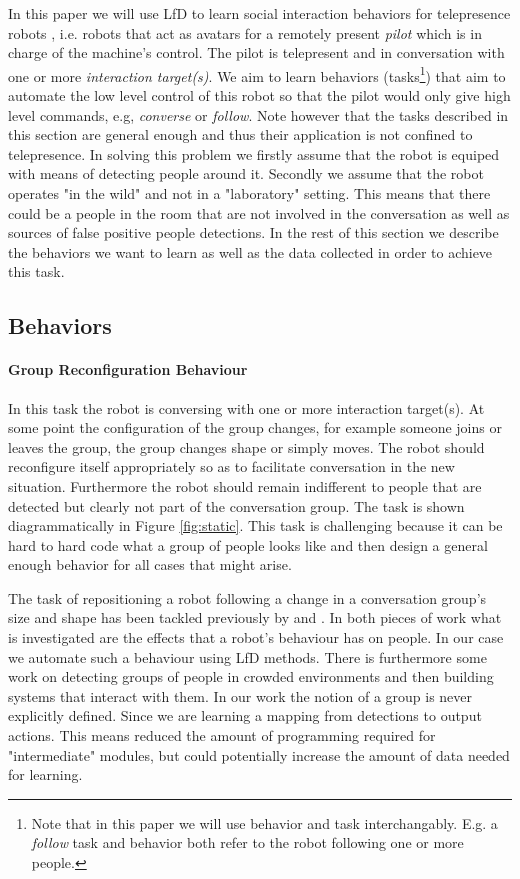 \documentclass[letterpaper, 10 pt, conference]{ieeeconf}
\begin{document}
In this paper we will use LfD to learn social interaction behaviors for telepresence robots \cite{kristoffersson2013review}, i.e. robots that act as avatars for a remotely present \emph{pilot} which is in charge of the machine's control. The pilot is telepresent and in conversation with one or more \emph{interaction target(s)}. We aim to learn behaviors (tasks\footnote{Note that in this paper we will use behavior and task interchangably. E.g. a \emph{follow} task and behavior both refer to the robot following one or more people.}) that aim to automate the low level control of this robot so that the pilot would only give high level commands, e.g, \emph{converse} or \emph{follow}. Note however that the tasks described in this section are general enough and thus their application is not confined to telepresence. In solving this problem we firstly assume that the robot is equiped with means of detecting people around it. Secondly we assume that the robot operates "in the wild" and not in a "laboratory" setting. This means that there could be a people in the room that are not involved in the conversation as well as sources of false positive people detections. In the rest of this section we describe the behaviors we want to learn as well as the data collected in order to achieve this task. 

\subsection{Behaviors \label{subsec:behaviors}}

\paragraph{Group Reconfiguration Behaviour} In this task the robot is conversing with one or more interaction target(s). At some point the configuration of the group changes, for example someone joins or leaves the group, the group changes shape or simply moves. The robot should reconfigure itself appropriately so as to facilitate conversation in the new situation. Furthermore the robot should remain indifferent to people that are detected but clearly not part of the conversation group. The task is shown diagrammatically in Figure \ref{fig:static}. This task is challenging because it can be hard to hard code what a group of people looks like and then design a general enough behavior for all cases that might arise.

The task of repositioning a robot following a change in a conversation group's size and shape has been tackled previously by \cite{kuzuoka2010reconfiguring} and \cite{vroon2015dynamics}. In both pieces of work what is investigated are the effects that a robot's behaviour has on people. In our case we automate such a behaviour using LfD methods.  There is furthermore some work on detecting groups of people in crowded environments \cite{lau2010multi} and then building systems that interact with them. In our work the notion of a group is never explicitly defined. Since we are learning a mapping from detections to output actions. This means reduced the amount of programming required for "intermediate" modules, but could potentially increase the amount of data needed for learning.
\end{document}
